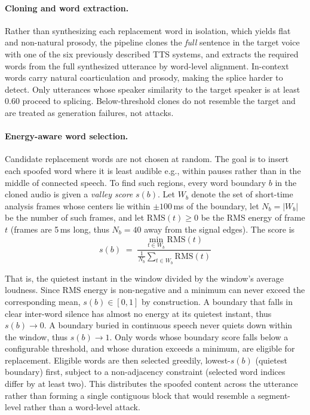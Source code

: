 \documentclass[11pt]{article}
\begin{document}
\paragraph{Cloning and word extraction.} Rather than synthesizing each
replacement word in isolation, which yields flat and non-natural prosody, the pipeline clones the \emph{full} sentence in the target voice with one of the six previously described TTS systems, and extracts the required words from the full synthesized utterance by word-level alignment.
In-context words carry natural coarticulation and prosody, making the
splice harder to detect. Only utterances whose speaker similarity to the
target speaker is at least 0.60 proceed to splicing. Below-threshold
clones do not resemble the target and are treated as generation
failures, not attacks. 

\paragraph{Energy-aware word selection.} Candidate replacement words are
not chosen at random. The goal is to insert each spoofed word where it is
least audible e.g., within pauses rather than in the middle of connected speech.
To find such regions, every word boundary $b$ in the cloned audio is given
a \emph{valley score} $s(b)$. Let $W_b$ denote the set of short-time
analysis frames whose centers lie within $\pm 100$\,ms of the boundary,
let $N_b = |W_b|$ be the number of such frames, and let
$\mathrm{RMS}(t) \ge 0$ be the RMS energy of frame $t$
(frames are 5\,ms long, thus $N_b = 40$ away from the signal edges). The
score is
\begin{equation}
s(b) \;=\; \frac{\displaystyle\min_{t \in W_b} \mathrm{RMS}(t)}
                 {\displaystyle\frac{1}{N_b}\sum_{t \in W_b} \mathrm{RMS}(t)}
\label{eq:valleyscore}
\end{equation}

That is, the quietest instant in the window divided by the window's
average loudness. Since RMS energy is non-negative and a minimum can
never exceed the corresponding mean, $s(b) \in [0,1]$ by construction. A
boundary that falls in clear inter-word silence has almost no energy at
its quietest instant, thus $s(b) \to 0$. A boundary buried in continuous
speech never quiets down within the window, thus $s(b) \to 1$. Only
words whose boundary score falls below a configurable threshold, and
whose duration exceeds a minimum, are eligible for replacement. Eligible
words are then selected greedily, lowest-$s(b)$ (quietest boundary)
first, subject to a non-adjacency constraint (selected word indices
differ by at least two). This distributes the spoofed content across
the utterance rather than forming a single contiguous block that would
resemble a segment-level rather than a word-level attack.
\end{document}
